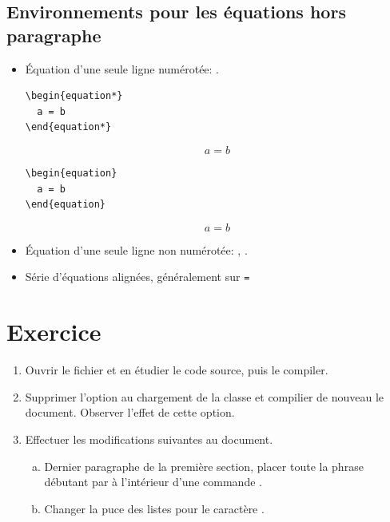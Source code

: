 \subsection{Environnements pour les équations hors paragraphe}

\begin{itemize}
\item Équation d'une seule ligne numérotée: .
  \renewcommand{\theequation}{\arabic{equation}}
  \begin{eqxample}
\begin{lstlisting}
\begin{equation*}
  a = b
\end{equation*}
\end{lstlisting}
    \producing
    \begin{equation*}
      a = b
    \end{equation*}
  \end{eqxample}

  \begin{eqxample}
\begin{lstlisting}
\begin{equation}
  a = b
\end{equation}
\end{lstlisting}
    \producing
    \begin{equation}
      a = b
    \end{equation}
  \end{eqxample}

\item Équation d'une seule ligne non numérotée: , .
\item Série d'équations alignées, généralement sur \verb|=|
\end{itemize}



\section{Exercice}
\label{sec:apparence:exercices}

\begin{exercice}
  \begin{enumerate}
  \item Ouvrir le fichier  et en
    étudier le code source, puis le compiler.
  \item Supprimer l'option  au chargement de la classe
    et compilier de nouveau le document. Observer l'effet de cette
    option.
  \item Effectuer les modifications suivantes au document.
    \begin{enumerate}[a)]
    \item Dernier paragraphe de la première section, placer toute la
      phrase débutant par  à l'intérieur
      d'une commande \cmd{\emph}.
    \item Changer la puce des listes pour le caractère \code{\$>\$}.
    \end{enumerate}
  \end{enumerate}
\end{exercice}

